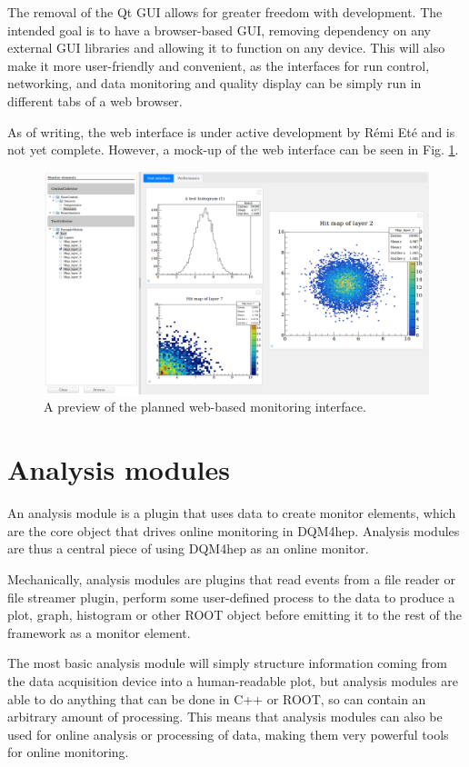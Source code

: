 The removal of the Qt \acrshort{GUI} allows for greater freedom with development. The intended goal is to have a browser-based GUI, removing dependency on any external \acrshort{GUI} libraries and allowing it to function on any device. This will also make it more user-friendly and convenient, as the interfaces for run control, networking, and data monitoring and quality display can be simply run in different tabs of a web browser.

As of writing, the web interface is under active development by R\'{e}mi Et\'{e} and is not yet complete. However, a mock-up of the web interface can be seen in Fig. \ref{figure:daq/dqm4hep/future-gui}.

\begin{figure}[h]
	\centering
	\includegraphics[width=1.0\textwidth]{../Pictures/ScreenshotWebMonitoring.png}
	\caption{A preview of the planned web-based monitoring interface.}
	\label{figure:daq/dqm4hep/future-gui}
\end{figure}

\section{Analysis modules}
An analysis module is a plugin that uses data to create monitor elements, which are the core object that drives online monitoring in \acrshort{DQM4hep}. Analysis modules are thus a central piece of using \acrshort{DQM4hep} as an online monitor.

Mechanically, analysis modules are plugins that read events from a file reader or file streamer plugin, perform some user-defined process to the data to produce a plot, graph, histogram or other ROOT object before emitting it to the rest of the framework as a monitor element.

The most basic analysis module will simply structure information coming from the data acquisition device into a human-readable plot, but analysis modules are able to do anything that can be done in C++ or ROOT, so can contain an arbitrary amount of processing. This means that analysis modules can also be used for online analysis or processing of data, making them very powerful tools for online monitoring. 

